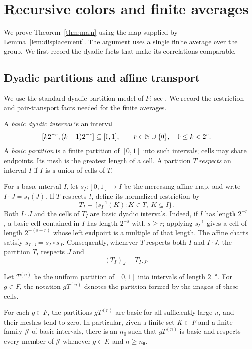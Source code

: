 \section{Recursive colors and finite averages}\label{sec:proof}

We prove Theorem~\ref{thm:main} using the map supplied by
Lemma~\ref{lem:displacement}.  The argument uses a single finite average
over the group.  We first record the dyadic facts that make its
correlations comparable.

\subsection{Dyadic partitions and affine transport}\label{sec:dyadic}

We use the standard dyadic-partition model of $F$; see
\cite[Section~2, Lemma~2.2]{CannonFloydParry1996}. We record the
restriction and pair-transport facts needed for the finite averages.

A \emph{basic dyadic interval} is an interval
\[
  [k2^{-r},(k+1)2^{-r}]\subseteq[0,1],
  \qquad r\in\mathbb N\cup\{0\},\quad 0\leq k<2^r.
\]
A \emph{basic partition} is a finite partition of $[0,1]$ into such
intervals; cells may share endpoints.  Its mesh is the greatest length
of a cell.  A partition $T$ \emph{respects} an interval $I$ if $I$ is a
union of cells of $T$.

For a basic interval $I$, let $s_I:[0,1]\to I$ be the increasing affine
map, and write $I\cdot J=s_I(J)$.  If $T$ respects $I$, define its
normalized restriction by
\[
  T_I=\{s_I^{-1}(K):K\in T,\ K\subseteq I\}.
\]
Both $I\cdot J$ and the cells of $T_I$ are basic dyadic intervals.
Indeed, if $I$ has length $2^{-r}$, a basic cell contained in $I$ has
length $2^{-s}$ with $s\geq r$; applying $s_I^{-1}$ gives a cell of
length $2^{-(s-r)}$ whose left endpoint is a multiple of that length.
The affine charts satisfy $s_{I\cdot J}=s_I\circ s_J$.  Consequently,
whenever $T$ respects both $I$ and $I\cdot J$, the partition $T_I$
respects $J$ and
\begin{equation}\label{dyad:restriction}
  (T_I)_J=T_{I\cdot J}.
\end{equation}

Let $T^{(n)}$ be the uniform partition of $[0,1]$ into intervals of
length $2^{-n}$.  For $g\in F$, the notation $gT^{(n)}$ denotes the
partition formed by the images of these cells.

\begin{lemma}\label{dyad:eventual}
For each $g\in F$, the partitions $gT^{(n)}$ are basic for all
sufficiently large $n$, and their meshes tend to zero.  In particular,
given a finite set $K\subset F$ and a finite family $\mathcal J$ of
basic intervals, there is an $n_0$ such that $gT^{(n)}$ is basic and
respects every member of $\mathcal J$ whenever $g\in K$ and $n\geq n_0$.
\end{lemma}

